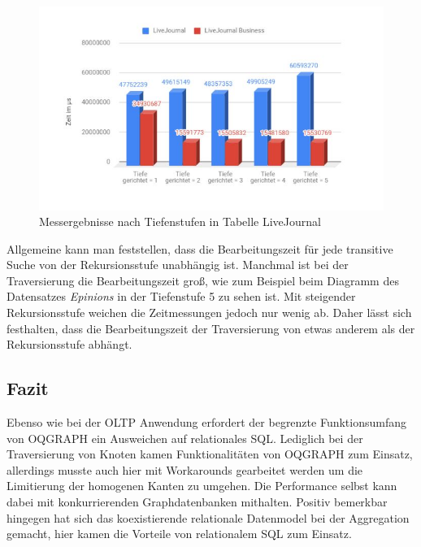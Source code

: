 \begin{figure}
	\centering
	\includegraphics[width=\textwidth]{images/LiJou.jpg}
	\caption{Messergebnisse nach Tiefenstufen in Tabelle LiveJournal}
	\label{fig:LiJou}
\end{figure}

Allgemeine kann man feststellen, dass die Bearbeitungszeit für jede transitive Suche von der Rekursionsstufe unabhängig ist. Manchmal ist bei der Traversierung die Bearbeitungszeit groß,  wie zum Beispiel beim Diagramm des Datensatzes \emph{Epinions} in der Tiefenstufe 5 zu sehen ist. Mit steigender Rekursionsstufe weichen die Zeitmessungen jedoch nur wenig ab. Daher lässt sich festhalten, dass die Bearbeitungszeit der Traversierung von etwas anderem als der Rekursionsstufe abhängt.

\subsection{Fazit}
Ebenso wie bei der OLTP Anwendung erfordert der begrenzte Funktionsumfang von OQGRAPH ein Ausweichen auf relationales SQL. Lediglich bei der Traversierung von Knoten kamen Funktionalitäten von OQGRAPH zum Einsatz, allerdings musste auch hier mit Workarounds gearbeitet werden um die Limitierung der homogenen Kanten zu umgehen. Die Performance selbst kann dabei mit konkurrierenden Graphdatenbanken mithalten. Positiv bemerkbar hingegen hat sich das koexistierende relationale Datenmodel bei der Aggregation gemacht, hier kamen die Vorteile von relationalem SQL zum Einsatz.
